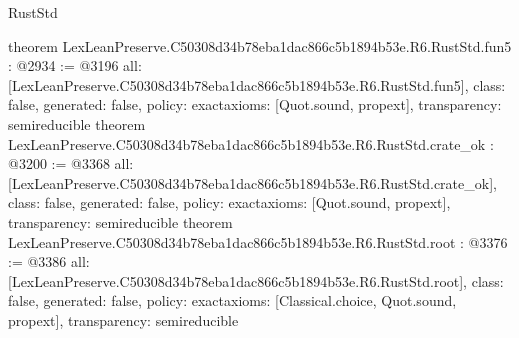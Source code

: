 \begin{lexlean}{RustStd}
\begin{coremodule}
{}
theorem LexLeanPreserve.C50308d34b78eba1dac866c5b1894b53e.R6.RustStd.fun5 : @2934 := @3196 {
  all: [LexLeanPreserve.C50308d34b78eba1dac866c5b1894b53e.R6.RustStd.fun5],
  class: false,
  generated: false,
  policy: exact{axioms: [Quot.sound, propext]},
  transparency: semireducible
}
theorem LexLeanPreserve.C50308d34b78eba1dac866c5b1894b53e.R6.RustStd.crate_ok : @3200 := @3368 {
  all: [LexLeanPreserve.C50308d34b78eba1dac866c5b1894b53e.R6.RustStd.crate_ok],
  class: false,
  generated: false,
  policy: exact{axioms: [Quot.sound, propext]},
  transparency: semireducible
}
theorem LexLeanPreserve.C50308d34b78eba1dac866c5b1894b53e.R6.RustStd.root : @3376 := @3386 {
  all: [LexLeanPreserve.C50308d34b78eba1dac866c5b1894b53e.R6.RustStd.root],
  class: false,
  generated: false,
  policy: exact{axioms: [Classical.choice, Quot.sound, propext]},
  transparency: semireducible
}


\end{coremodule}
\end{lexlean}
